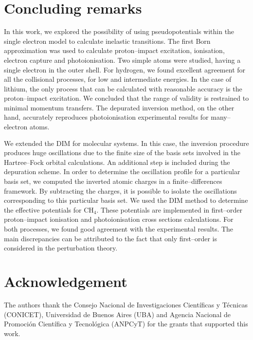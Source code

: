 \documentclass[10pt]{article}
\begin{document}
\section{Concluding remarks}

In this work, we explored the possibility of using pseudopotentials 
within the single electron model to calculate inelastic transitions. 
The first Born approximation was used to calculate proton--impact 
excitation, ionisation, electron capture and photoionisation. Two 
simple atoms were studied, having a single electron in the outer 
shell. For hydrogen, we found excellent agreement for all the 
collisional processes, for low and intermediate energies. In the case 
of lithium, the only process that can be calculated with reasonable 
accuracy is the proton--impact excitation. We concluded that the 
range of validity is restrained to minimal momentum transfers. 
The depurated inversion method, on the other hand, accurately 
reproduces photoionisation experimental results for many--electron 
atoms. 

We extended the DIM for molecular systems. In this case, the 
inversion procedure produces huge oscillations due to the finite size 
of the basis sets involved in the Hartree--Fock orbital calculations. 
An additional step is included during the depuration scheme. In order 
to determine the oscillation profile for a particular basis set, we 
computed the inverted atomic charges in a finite--differences 
framework. By subtracting the charges, it is possible to isolate the 
oscillations corresponding to this particular basis set. We used the 
DIM method to determine the effective potentials for CH$_4$. These 
potentials are implemented in first--order proton--impact ionisation
and photoionisation cross sections calculations. For both processes, 
we found good agreement with the experimental results. The main
discrepancies can be attributed to the fact that only first--order is 
considered in the perturbation theory.


\section*{Acknowledgement}
The authors thank the Consejo Nacional de Investigaciones 
Cient\'ificas y T\'ecnicas (CONICET), Universidad de Buenos Aires (UBA)
and Agencia Nacional de Promoci\'on Cient\'ifica y Tecnol\'ogica (ANPCyT)
for the grants that supported this work.


% 
% 
\end{document}
